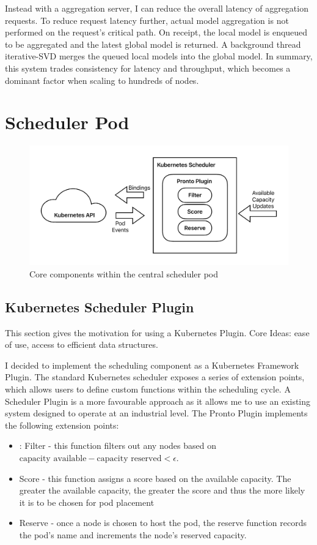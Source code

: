 Instead with a aggregation server, I can reduce the overall latency of
aggregation requests. To reduce request latency further, actual model
aggregation is not performed on the request's critical path. On receipt, the local
model is enqueued to be aggregated and the latest global model is returned. A
background thread iterative-SVD merges the queued local models into the global
model. In summary, this system trades consistency for latency and throughput,
which becomes a dominant factor when scaling to hundreds of nodes.

\section{Scheduler Pod}
\begin{figure}[H]
    \centering
    \includegraphics[width=\textwidth]{images/pronto-sched.pdf}
    \caption{Core components within the central scheduler pod}
    \label{spazio-sched-components}
\end{figure}

\subsection{Kubernetes Scheduler Plugin}
This section gives the motivation for using a Kubernetes Plugin. Core Ideas:
ease of use, access to efficient data structures.

I decided to implement the scheduling component as a Kubernetes Framework
Plugin. The standard Kubernetes scheduler exposes a series of extension points,
which allows users to define custom functions within the scheduling cycle. A
Scheduler Plugin is a more favourable approach as it allows me to use an
existing system designed to operate at an industrial level. The Pronto Plugin
implements the following extension points:
\begin{itemize}
    \item: Filter - this function filters out any nodes based on $
        \text{capacity available} - \text{capacity reserved} < \epsilon$.
    \item Score - this function assigns a score based on the available capacity.
        The greater the available capacity, the greater the score and thus the
        more likely it is to be chosen for pod placement
    \item Reserve - once a node is chosen to host the pod, the reserve function
        records the pod's name and increments the node's reserved capacity.
\end{itemize}

